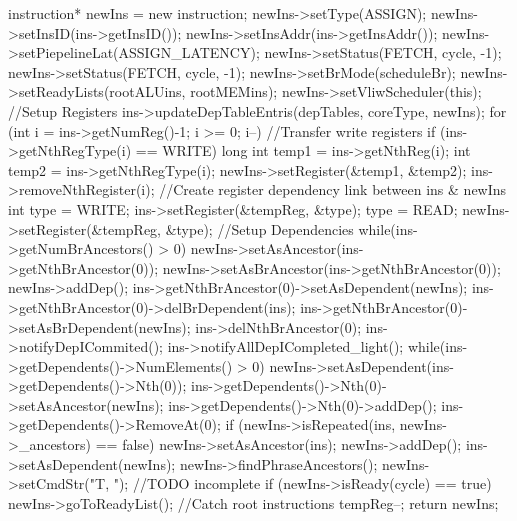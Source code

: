 \begin{DoxyCode}
                                                                   {
        instruction* newIns = new instruction;
        newIns->setType(ASSIGN);
        newIns->setInsID(ins->getInsID());
        newIns->setInsAddr(ins->getInsAddr());
        newIns->setPiepelineLat(ASSIGN_LATENCY);
        newIns->setStatus(FETCH, cycle, -1);
        newIns->setStatus(FETCH, cycle, -1);
        newIns->setBrMode(scheduleBr);
        newIns->setReadyLists(rootALUins, rootMEMins);
        newIns->setVliwScheduler(this);
        //Setup Registers
        ins->updateDepTableEntris(depTables, coreType, newIns);
        for (int i = ins->getNumReg()-1; i >= 0; i--) {
                //Transfer write registers
                if (ins->getNthRegType(i) == WRITE) {
                        long int temp1 = ins->getNthReg(i);
                        int temp2 = ins->getNthRegType(i);
                        newIns->setRegister(&temp1, &temp2);
                        ins->removeNthRegister(i);
                }
                //Create register dependency link between ins & newIns 
                int type = WRITE;
                ins->setRegister(&tempReg, &type);
                type = READ;
                newIns->setRegister(&tempReg, &type);
        }
        //Setup Dependencies
        while(ins->getNumBrAncestors() > 0) {
                newIns->setAsAncestor(ins->getNthBrAncestor(0));
                newIns->setAsBrAncestor(ins->getNthBrAncestor(0));
                newIns->addDep();
                ins->getNthBrAncestor(0)->setAsDependent(newIns);
                ins->getNthBrAncestor(0)->delBrDependent(ins);
                ins->getNthBrAncestor(0)->setAsBrDependent(newIns);
                ins->delNthBrAncestor(0);
        }
        ins->notifyDepICommited();
        ins->notifyAllDepICompleted_light();
        while(ins->getDependents()->NumElements() > 0) {
                newIns->setAsDependent(ins->getDependents()->Nth(0));
                ins->getDependents()->Nth(0)->setAsAncestor(newIns);
                ins->getDependents()->Nth(0)->addDep();
                ins->getDependents()->RemoveAt(0);
        }
        if (newIns->isRepeated(ins, newIns->_ancestors) == false) {
                newIns->setAsAncestor(ins);
                newIns->addDep();
        }
        ins->setAsDependent(newIns);
        newIns->findPhraseAncestors();
        newIns->setCmdStr("T, "); //TODO incomplete
        if (newIns->isReady(cycle) == true) newIns->goToReadyList(); //Catch root
       instructions
        tempReg--;
        return newIns;
}
\end{DoxyCode}
